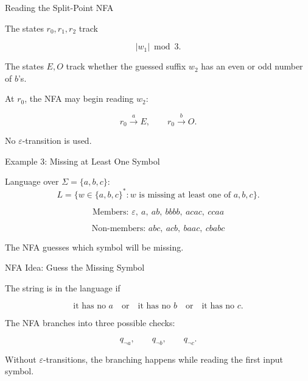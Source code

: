 \documentclass[10pt,aspectratio=169]{beamer}
\newcommand{\eps}{\varepsilon}
\begin{document}
\begin{frame}{Reading the Split-Point NFA}

The states \(r_0,r_1,r_2\) track

\[
|w_1| \bmod 3.
\]

\vspace{0.7em}

The states \(E,O\) track whether the guessed suffix \(w_2\) has an even or odd number of \(b\)'s.

\vspace{0.7em}

\pause

At \(r_0\), the NFA may begin reading \(w_2\):

\[
r_0 \xrightarrow{a} E,
\qquad
r_0 \xrightarrow{b} O.
\]

\vspace{0.5em}

No $\eps$-transition is used.

\end{frame}

\begin{frame}{Example 3: Missing at Least One Symbol}

Language over $\Sigma=\{a,b,c\}$:
\[
L=\{w\in\{a,b,c\}^*: w\text{ is missing at least one of }a,b,c\}.
\]

\[
\text{Members: } \eps,\ a,\ ab,\ bbbb,\ acac,\ ccaa
\]

\[
\text{Non-members: } abc,\ acb,\ baac,\ cbabc
\]

\vspace{0.5em}

\pause
The NFA guesses which symbol will be missing.

\end{frame}

\begin{frame}{NFA Idea: Guess the Missing Symbol}

The string is in the language if

\[
\text{it has no }a
\quad\text{or}\quad
\text{it has no }b
\quad\text{or}\quad
\text{it has no }c.
\]

\vspace{0.7em}

The NFA branches into three possible checks:

\[
q_{\neg a},\qquad q_{\neg b},\qquad q_{\neg c}.
\]

\vspace{0.7em}

\pause
Without $\eps$-transitions, the branching happens while reading the first input symbol.

\end{frame}
\end{document}
